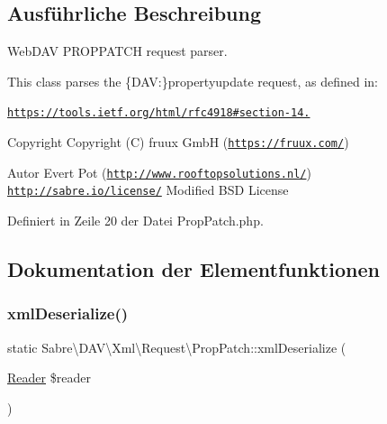 \subsection{Ausführliche Beschreibung}
Web\+D\+AV P\+R\+O\+P\+P\+A\+T\+CH request parser.

This class parses the \{D\+AV\+:\}propertyupdate request, as defined in\+:

\href{https://tools.ietf.org/html/rfc4918#section-14.20}{\tt https\+://tools.\+ietf.\+org/html/rfc4918\#section-\/14.}

\begin{DoxyCopyright}{Copyright}
Copyright (C) fruux GmbH (\href{https://fruux.com/}{\tt https\+://fruux.\+com/}) 
\end{DoxyCopyright}
\begin{DoxyAuthor}{Autor}
Evert Pot (\href{http://www.rooftopsolutions.nl/}{\tt http\+://www.\+rooftopsolutions.\+nl/})  \href{http://sabre.io/license/}{\tt http\+://sabre.\+io/license/} Modified B\+SD License 
\end{DoxyAuthor}


Definiert in Zeile 20 der Datei Prop\+Patch.\+php.



\subsection{Dokumentation der Elementfunktionen}
\mbox{\label{class_sabre_1_1_d_a_v_1_1_xml_1_1_request_1_1_prop_patch_ac74d98985e31da7cb22333993b6f0cc6}} 
\subsubsection{\texorpdfstring{xml\+Deserialize()}{xmlDeserialize()}}
{\footnotesize\ttfamily static Sabre\textbackslash{}\+D\+A\+V\textbackslash{}\+Xml\textbackslash{}\+Request\textbackslash{}\+Prop\+Patch\+::xml\+Deserialize (\begin{DoxyParamCaption}\item[{\mbox{\hyperlink{class_sabre_1_1_xml_1_1_reader}{Reader}}}]{\$reader }\end{DoxyParamCaption})\hspace{0.3cm}{\ttfamily [static]}}

